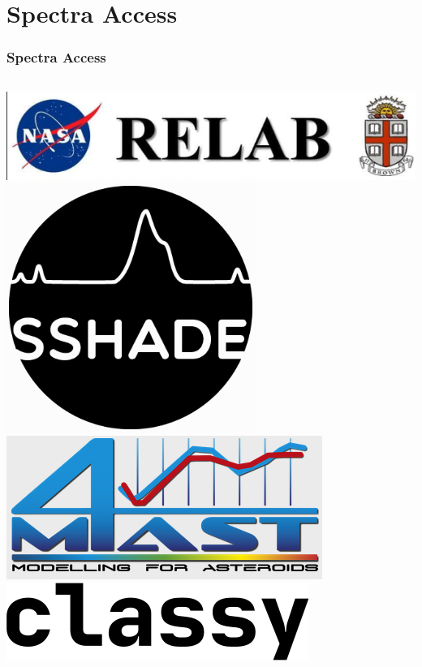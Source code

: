 \section{Spectra Access}
\label{sec:spectra_access}

\begin{frame}
  \frametitle{Spectra Access}

  \begin{columns}[T]

      \begin{column}{.3\textwidth}
        \centering
        \vspace{0.5em}\includegraphics[width=.8\textwidth]{gfx/logo_relab}\\
        \vspace{0.5em}\includegraphics[width=.6\textwidth]{gfx/logo_sshade}\\
        \vspace{0.5em}\includegraphics[width=.8\textwidth]{gfx/logo_m4ast}\\
        \vspace{0.5em}\includegraphics[width=.8\textwidth]{gfx/logo_classy}\\
      \end{column}



\end{columns}
\end{frame}
